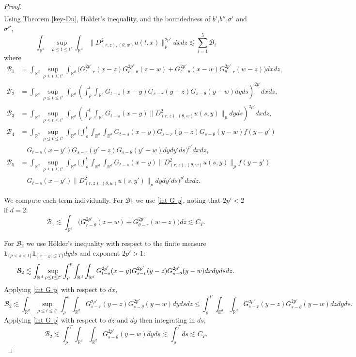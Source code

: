 \documentclass[10pt,a4paper]{amsart}
\def\bR{\mathbb{R}}
\def\cB{\mathcal{B}}
\newcommand{\les}{\lesssim}
\def\s{\sigma}
\begin{document}
\begin{proof}
\begin{align*}
\end{align*}
Using Theorem \ref{key-Du}, H\"older's inequality, and the boundedness of $b'$,$b''$,$\s'$ and $\s''$, 
\[
 \int_{\bR^d} \sup_{\rho \leq t \leq t'} \int_{\bR^d} \|D^2_{(r,z),(\theta,w)}u(t,x)\|_{p}^{2p'} dx dz \les \sum_{i=1}^5 \cB_i
\]
where
\begin{align*}
 \cB_1 & = \int_{\bR^d} \sup_{\rho \leq t \leq t'} \int_{\bR^d} \Big(G^{2p'}_{t-r}(x-z)G^{2p'}_{r-\theta}(z-w) + G^{2p'}_{t-\theta}(x-w)G^{2p'}_{\theta-r}(w-z) \Big) dx dz, \\
 \cB_2 & = \int_{\bR^d} \sup_{\rho \leq t \leq t'} \int_{\bR^d} \left( \int_\rho^t \int_{\bR^d} G_{t-s}(x-y)G_{s-r}(y-z)G_{s-\theta}(y-w) dy ds\right)^{2p'} dx dz, \\
 \cB_3 & = \int_{\bR^d} \sup_{\rho \leq t \leq t'}  \int_{\bR^d} \left( \int_\rho^t \int_{\bR^d} G_{t-s}(x-y) \|D^2_{(r,z),(\theta,w)}u(s,y)\|_{p}  dy ds\right)^{2p'} dx dz, \\
 \cB_4 & = \int_{\bR^d} \sup_{\rho \leq t \leq t'}  \int_{\bR^d} \bigg( \int_\rho^t \int_{\bR^d} \int_{\bR^d} G_{t-s}(x-y)G_{s-r}(y-z)G_{s-\theta}(y-w) f(y-y') \\
 & \quad G_{t-s}(x-y')G_{s-r}(y'-z)G_{s-\theta}(y'-w) dydy' ds\bigg)^{p'} dx dz, \\
 \cB_5 & = \int_{\bR^d} \sup_{\rho \leq t \leq t'}  \int_{\bR^d} \bigg( \int_\rho^t \int_{\bR^d} \int_{\bR^d} G_{t-s}(x-y) \|D^2_{(r,z),(\theta,w)}u(s,y)\|_{p} f(y-y') \\
 & \quad G_{t-s}(x-y') \|D^2_{(r,z),(\theta,w)}u(s,y')\|_{p} dy dy' ds\bigg)^{p'} dx dz. 
\end{align*}

We compute each term individually. For $\cB_1$ we use \eqref{int G p}, noting that $2p'<2$ if $d=2$:
\[
\cB_1 \les \int_{\bR^d} \Big( G^{2p'}_{r-\theta}(z-w) + G^{2p'}_{\theta-r}(w-z)\Big) dz  \les C_T.
\]

For $\cB_2$ we use H\"older's inequality with respect to the finite measure $\mathbf 1_{\{\rho < s < t\}} \mathbf 1_{\{|x-y| \leq T\}}dyds$ and exponent $2p' > 1$:
\[
 \cB_2 \les \int_{\bR^d} \sup_{\rho \leq t \leq t'}  \int_\rho^t \int_{\bR^d} \int_{\bR^d}  G^{2p'}_{t-s}(x-y)G^{2p'}_{s-r}(y-z)G^{2p'}_{s-\theta}(y-w) dx dy ds dz. \\
\]
Applying \eqref{int G p} with respect to $dx$, 
\[
 \cB_2 \les \int_{\bR^d} \sup_{\rho \leq t \leq t'}  \int_\rho^t \int_{\bR^d}G^{2p'}_{s-r}(y-z)G^{2p'}_{s-\theta}(y-w) dy ds dz \leq \int_\rho^{t'} \int_{\bR^d} \int_{\bR^d} G^{2p'}_{s-r}(y-z)G^{2p'}_{s-\theta}(y-w) dz dy ds.
\]
 Applying \eqref{int G p} with respect to $dz$ and $dy$ then integrating in $ds$, 
\[
 \cB_2 \les \int_\rho^T \int_{\bR^d} \int_{\bR^d} G^{2p'}_{s-\theta}(y-w) dy ds \les \int_\rho^T ds \les C_T.
\]


\end{proof}
\end{document}
